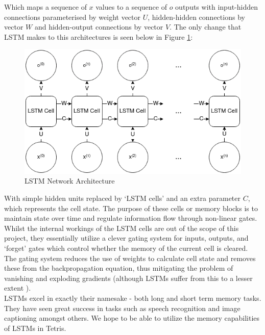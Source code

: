 \documentclass[12pt]{article}
\begin{document}
Which maps a sequence of $x$ values to a sequence of $o$ outputs with input-hidden connections parameterised by weight vector $U$, hidden-hidden connections by vector $W$ and hidden-output connections by vector $V$. The only change that LSTM makes to this architectures is seen below in Figure \ref{lstm}:
\begin{figure}[H]
    \centering
    \includegraphics[scale=0.7]{24.png}
    \caption{LSTM Network Architecture}
    \label{lstm}
\end{figure}
With simple hidden units replaced by `LSTM cells' and an extra parameter $C$, which represents the cell state. The purpose of these cells or memory blocks is to maintain state over time and regulate information flow through non-linear gates. Whilst the internal workings of the LSTM cells are out of the scope of this project, they essentially utilize a clever gating system for inputs, outputs, and `forget' gates which control whether the memory of the current cell is cleared. The gating system reduces the use of weights to calculate cell state and removes these from the backpropagation equation, thus mitigating the problem of vanishing and exploding gradients (although LSTMs suffer from this to a lesser extent \autocite{calin2020deep}). \\\newline
LSTMs excel in exactly their namesake - both long and short term memory tasks. They have seen great success in tasks such as speech recognition \autocite{graves2014towards} and image captioning \autocite{kiros2014unifying} amongst others. We hope to be able to utilize the memory capabilities of LSTMs in Tetris.  
\end{document}
